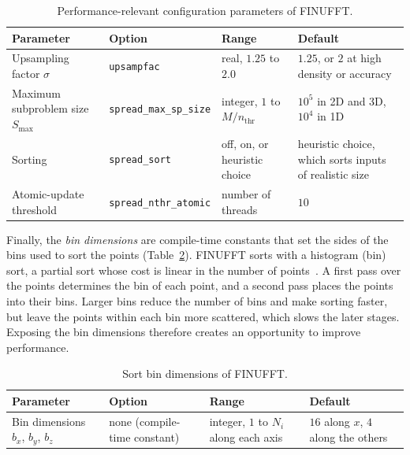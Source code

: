 \begin{table}[ht]
    \centering
    \small
    \begin{tabularx}{\textwidth}{>{\raggedright\arraybackslash}p{3.2cm} >{\raggedright\arraybackslash}p{3.6cm} >{\raggedright\arraybackslash}X >{\raggedright\arraybackslash}X}
        \toprule
        \textbf{Parameter} & \textbf{Option} & \textbf{Range} & \textbf{Default} \\
        \midrule
        Upsampling factor $\sigma$ & \texttt{upsampfac} & real, $1.25$ to $2.0$ & $1.25$, or $2$ at high density or accuracy \\
        Maximum subproblem size $S_{\max}$ & \texttt{spread\_max\_sp\_size} & integer, $1$ to $M/n_{\mathrm{thr}}$ & $10^5$ in 2D and 3D, $10^4$ in 1D \\
        Sorting & \texttt{spread\_sort} & off, on, or heuristic choice & heuristic choice, which sorts inputs of realistic size \\
        Atomic-update threshold & \texttt{spread\_nthr\_atomic} & number of threads & $10$ \\
        \bottomrule
    \end{tabularx}
    \caption{Performance-relevant configuration parameters of FINUFFT.}
    \label{tab:finufft_params}
\end{table}

Finally, the \emph{bin dimensions} are compile-time constants that set the
sides of the bins used to sort the points (Table~\ref{tab:finufft_bins}).
FINUFFT sorts with a histogram (bin) sort, a partial sort whose cost is linear
in the number of points~\cite{barnett2019}. A first pass over the points
determines the bin of each point, and a second pass places the points into
their bins. Larger bins reduce the number of bins and make sorting faster, but
leave the points within each bin more scattered, which slows the later stages.
Exposing the bin dimensions therefore creates an opportunity to improve
performance.

\begin{table}[ht]
    \centering
    \small
    \begin{tabularx}{\textwidth}{>{\raggedright\arraybackslash}p{3.2cm} >{\raggedright\arraybackslash}p{3.6cm} >{\raggedright\arraybackslash}X >{\raggedright\arraybackslash}X}
        \toprule
        \textbf{Parameter} & \textbf{Option} & \textbf{Range} & \textbf{Default} \\
        \midrule
        Bin dimensions $b_x$, $b_y$, $b_z$ & none (compile-time constant) & integer, $1$ to $N_i$ along each axis & $16$ along $x$, $4$ along the others \\
        \bottomrule
    \end{tabularx}
    \caption{Sort bin dimensions of FINUFFT.}
    \label{tab:finufft_bins}
\end{table}

